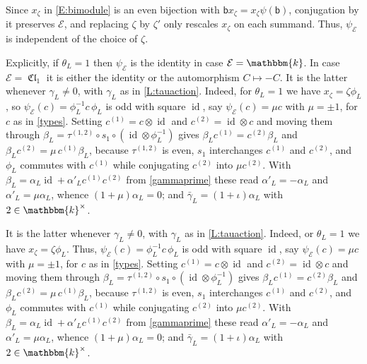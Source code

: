 \documentclass[a4paper,11pt]{amsart}
\numberwithin{equation}{subsection}
\theoremstyle{definition}
\theoremstyle{theorem}
\theoremstyle{remark}
\DeclareMathOperator\Cl{\mathfrak{Cl}}
\newcommand\bb{\mathsf{b}}
\newcommand\op{\operatorname}
\newcommand\kk{\mathbbm{k}}
\begin{document}
\begin{Remark}\label{psiE}
 Since $x_\zeta$ in \autoref{E:bimodule} is an even
  bijection with $\bb x_\zeta=x_\zeta\psi(\bb)$,
  conjugation by it preserves $\mathcal E$, and replacing $\zeta$ by $\zeta'$ only
  rescales $x_\zeta$ on each summand. Thus, $\psi_{\mathcal E}$ is independent of the choice of
  $\zeta$.

   Explicitly, if $\theta_L=1$ then $\psi_{\mathcal E}$ is the identity in case $\mathcal E=\kk$. In case $\mathcal E=\Cl_1$ it is either the identity or the automorphism $C\mapsto-C$.
   It is the latter whenever $\gamma_L\ne0$, with $\gamma_L$ as in \autoref{L:tauaction}. Indeed, for
$\theta_L=1$ we have $x_\zeta=\zeta\phi_L$, so $\psi_{\mathcal E}(c)=\phi_L^{-1}c\,\phi_L$ is
odd with square $\op{id}$, say $\psi_{\mathcal E}(c)=\mu c$ with $\mu=\pm1$, for $c$ as in
\autoref{types}. Setting $c^{(1)}=c\otimes\op{id}$ and $c^{(2)}=\op{id}\otimes c$ and moving
them through $\beta_L=\tau^{(1,2)}\circ s_1\circ(\op{id}\otimes\phi_L^{-1})$ gives
$\beta_Lc^{(1)}=c^{(2)}\beta_L$ and $\beta_Lc^{(2)}=\mu\,c^{(1)}\beta_L$, because
$\tau^{(1,2)}$ is even, $s_1$ interchanges $c^{(1)}$ and $c^{(2)}$, and $\phi_L$ commutes with
$c^{(1)}$ while conjugating $c^{(2)}$ into $\mu c^{(2)}$. With
$\beta_L=\alpha_L\op{id}+\alpha'_Lc^{(1)}c^{(2)}$ from \autoref{gammaprime} these read
$\alpha'_L=-\alpha_L$ and $\alpha'_L=\mu\alpha_L$, whence $(1+\mu)\alpha_L=0$; and
$\bar\gamma_L=(1+\iota)\alpha_L$ with $2\in\kk^\times$.

It is the latter whenever $\gamma_L\ne0$, with $\gamma_L$ as in \autoref{L:tauaction}. Indeed, or
$\theta_L=1$ we have $x_\zeta=\zeta\phi_L$. Thus,  $\psi_{\mathcal E}(c)=\phi_L^{-1}c\,\phi_L$ is
odd with square $\op{id}$, say $\psi_{\mathcal E}(c)=\mu c$ with $\mu=\pm1$, for $c$ as in
\autoref{types}. Setting $c^{(1)}=c\otimes\op{id}$ and $c^{(2)}=\op{id}\otimes c$ and moving
them through $\beta_L=\tau^{(1,2)}\circ s_1\circ(\op{id}\otimes\phi_L^{-1})$ gives
$\beta_Lc^{(1)}=c^{(2)}\beta_L$ and $\beta_Lc^{(2)}=\mu\,c^{(1)}\beta_L$, because
$\tau^{(1,2)}$ is even, $s_1$ interchanges $c^{(1)}$ and $c^{(2)}$, and $\phi_L$ commutes with
$c^{(1)}$ while conjugating $c^{(2)}$ into $\mu c^{(2)}$. With
$\beta_L=\alpha_L\op{id}+\alpha'_Lc^{(1)}c^{(2)}$ from \autoref{gammaprime} these read
$\alpha'_L=-\alpha_L$ and $\alpha'_L=\mu\alpha_L$, whence $(1+\mu)\alpha_L=0$; and
$\bar\gamma_L=(1+\iota)\alpha_L$ with $2\in\kk^\times$.
\end{Remark}
\end{document}
